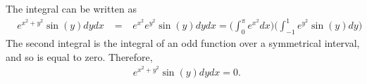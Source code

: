 \item %
The integral can be written as
\begin{align*}
  \mathop{\int_0^{\pi} \!\! \int_{-1}^1} e^{x^2 + y^2}\sin(y) dydx 
  &= \mathop{\int_0^{\pi} \!\! \int_{-1}^1} e^{x^2}e^{y^2}\sin(y) dydx  = \Bigg( \int_0^{\pi} e^{x^2} dx \Bigg)\Bigg( \int_{-1}^1 e^{y^2}\sin(y)dy \Bigg)  
\end{align*}
The second integral is the integral of an odd function over a symmetrical interval, and so is equal to zero. Therefore,
\begin{align*}
  \mathop{\int_0^{\pi} \!\! \int_{-1}^1} e^{x^2 + y^2}\sin(y) dydx =0.
\end{align*}

\EEN %
